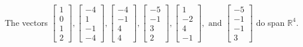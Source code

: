 \begin{exercise}
\begin{exerciseStatement}
  \end{exerciseStatement}
  \begin{exerciseAnswer}
   The vectors \(\left[\begin{array}{r}
1 \\
0 \\
1 \\
2
\end{array}\right] , \left[\begin{array}{r}
-4 \\
1 \\
-1 \\
-4
\end{array}\right] , \left[\begin{array}{r}
-4 \\
-1 \\
4 \\
4
\end{array}\right] , \left[\begin{array}{r}
-5 \\
-1 \\
3 \\
2
\end{array}\right] , \left[\begin{array}{r}
1 \\
-2 \\
4 \\
-1
\end{array}\right] , \text{ and } \left[\begin{array}{r}
-5 \\
-1 \\
-1 \\
3
\end{array}\right]\) 
  	 do  
	span \(\mathbb{R}^4\).
  


  \end{exerciseAnswer}
\end{exercise}